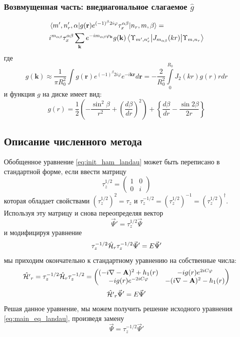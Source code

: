 \documentclass[a4paper,article,14pt]{extarticle}
\begin{document}
\subsubsection{Возвмущенная часть: внедиагональное слагаемое $\hat g$}

\begin{equation}
\begin{aligned}
&\mel{m', n'_r, \alpha} {g(\mathbf{r})   e^{ (-1)^{\beta} 2  i   \varphi} \tau^{\alpha \beta}_x} {n_r,m,\beta} = \\ 
&i^{m_{\alpha \beta}} \tau^{\alpha \beta}_x \sum\limits_{\mathbf{k} }      e^{-i m_{\alpha \beta} \varphi_{\mathbf{k}}}  g(\mathbf{k})\mel{\Upsilon_{m', n'_r}} {J_{m_{\alpha \beta}} (kr) }{\Upsilon_{m, n_r}}
\end{aligned}
\end{equation}
\noindent где 
\begin{equation}
g (\mathbf{k}) \approx \frac{1}{\pi R_0^2}  \int  g(\mathbf{r})   e^{ (-1)^{\beta} 2  i   \varphi} e^{-i \mathbf{k} \mathbf{r}}  d\mathbf{r} = - \frac{2}{R_0^2}  \int\limits_{0}^{R_0}  J_2 (k r ) g(r) r dr 
\end{equation} 
и функция $g$ на диске имеет вид:
\begin{equation}
g(r) = \frac{1}{2}\left(  - \frac{\sin ^2\beta }{r^2} + \left( \frac{d\beta }{dr} \right)^2 \right) 
+ \left\{ \frac{d\beta }{dr} - \frac{\sin 2\beta }{2r} \right\}
\end{equation}

\subsection{ Описание численного метода  }


Обобщенное уравнение \eqref{eq:init_ham_landau} может быть переписано в стандартной форме, если ввести матрицу
$$
\tau_z^{1/2} = 
	\begin{pmatrix} 	
		1 &  0 \\
		0 &  i 
	\end{pmatrix}
$$
которая обладает свойствами $(\tau_z^{1/2})^2 = \tau_z$ и $\tau_z^{-1/2}=(\tau_z^{1/2})^{-1}=(\tau_z^{1/2})^\dagger$.
Используя эту матрицу и снова переопределяя вектор 
$$
\vec{\Psi}'=\tau_z^{1/2} \vec{\Psi}
$$
и модифицируя уравнение
$$
\tau_z^{-1/2} \hat {\cal H}_{r} \tau_z^{-1/2} \vec{\Psi}' = E \vec{\Psi}'
$$
мы приходим окончательно к стандартному уравнению на собственные числа:
$$
\hat {\cal H'}_{r} = \tau_z^{-1/2} \hat {\cal H}_{r} \tau_z^{-1/2} = \begin{pmatrix} 
(- i \nabla - \mathbf{A} ) ^ 2 + h_1 (r) &  -i g (r) e^{2 i C \varphi} \\  
-i g (r) e^{-2 i C \varphi}   & - ( i \nabla - \mathbf{A} ) ^ 2 - h_1 (r) 
\end{pmatrix}
$$
$$
\hat {\cal H'}_{r} \vec{\Psi}' = E \vec{\Psi}'
$$
Решая данное уравнение, мы можем получить решение исходного уравнения \eqref{eq:main_eq_landau}, произведя замену
$$
\vec{\Psi} = \tau_z^{-1/2} \vec{\Psi}'
$$
\end{document}
